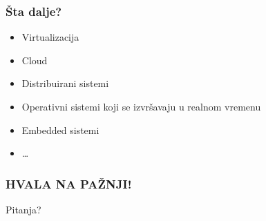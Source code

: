 \documentclass{beamer}
\begin{document}
\begin{frame}
    \frametitle{Šta dalje?}
    \begin{itemize}
        \item Virtualizacija \newline
        \item Cloud \newline
        \item Distribuirani sistemi \newline
        \item Operativni sistemi koji se izvršavaju u realnom vremenu \newline
        \item Embedded sistemi \newline
        \item \dots
    \end{itemize}
\end{frame}

\begin{frame}
    \frametitle{HVALA NA PAŽNJI!}
    \begin{center}
        \Huge Pitanja?    
    \end{center}
\end{frame}
\end{document}
